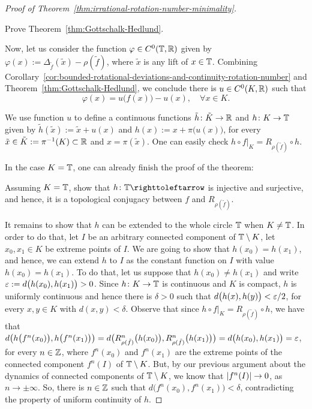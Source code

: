 \begin{proof}[Proof of Theorem~\ref{thm:irrational-rotation-number-minimality}]
  \begin{exercise}
    Prove Theorem~\ref{thm:Gottschalk-Hedlund}.
  \end{exercise}

  Now, let us consider the function $\varphi\in C^0(\mathbb{T},\mathbb{R})$ given by $\varphi(x):=\Delta_{\tilde f}(\tilde x)-\rho(\tilde f)$, where $\tilde x$ is any lift of $x\in\mathbb{T}$. Combining Corollary~\ref{cor:bounded-rotational-deviations-and-continuity-rotation-number} and Theorem~\ref{thm:Gottschalk-Hedlund}, we conclude there is $u\in C^0(K,\mathbb{R})$ such that
  \begin{displaymath}
    \varphi(x)=u\big(f(x)\big)-u(x), \quad\forall x\in K.
  \end{displaymath}

  We use function $u$ to define a continuous functions $\tilde h\colon\tilde{K}\to\mathbb{R}$ and $h\colon K\to\mathbb{T}$ given by $\tilde h(\tilde x):=\tilde x+u(x)$ and $h(x):=x+\pi\big(u(x)\big)$, for every $\tilde x\in\tilde{K}:=\pi^{-1}(K)\subset\mathbb{R}$ and $x=\pi(\tilde x)$. One can easily check $h\circ f\big|_K=R_{\rho(\tilde f)}\circ h$.

  In the case $K=\mathbb{T}$, one can already finish the proof of the theorem:

  \begin{exercise}
    Assuming $K=\mathbb{T}$, show that $h\colon\T\carr$ is injective and surjective, and hence, it is a topological conjugacy between $f$ and $R_{\rho(\tilde f)}$.
  \end{exercise}

  It remains to show that $h$ can be extended to the whole circle $\mathbb{T}$ when $K\neq\mathbb{T}$. In order to do that, let $I$ be an arbitrary connected component of $\mathbb{T}\setminus K$, let $x_0,x_1\in K$ be extreme points of $I$. We are going to show that $h(x_0)=h(x_1)$, and hence, we can extend $h$ to $I$ as the constant function on $I$ with value $h(x_0)=h(x_1)$. To do that, let us suppose that $h(x_0)\neq h(x_1)$ and write $\varepsilon:=d\big(h(x_0),h(x_1)\big)>0$. Since $h\colon K\to\mathbb{T}$ is continuous and $K$ is compact, $h$ is uniformly continuous and hence there is $\delta>0$ such that $d\big(h(x),h(y)\big)<\varepsilon/2$, for every $x,y\in K$ with $d(x,y)<\delta$. Observe that since $h\circ f\big|_K=R_{\rho(\tilde f)}\circ h$, we have that $d\big(h\big(f^n(x_0)\big),h\big(f^n(x_1)\big)\big)=d\big(R_{\rho(\tilde f)}^n\big(h(x_0)\big),R_{\rho(\tilde f)}^n\big(h(x_1)\big)\big)=d\big(h(x_0),h(x_1)\big)=\varepsilon$, for every $n\in\mathbb{Z}$, where $f^n(x_0)$ and $f^n(x_1)$ are the extreme points of the connected component $f^n(I)$ of $\mathbb{T}\setminus K$. But, by our previous argument about the dynamics of connected components of $\mathbb{T}\setminus K$, we know that $\left\lvert{f^n(I)}\right\rvert\to 0$, as $n\to\pm\infty$. So, there is $n\in\mathbb{Z}$ such that $d\big(f^n(x_0),f^n(x_1)\big)<\delta$, contradicting  the property of uniform continuity of $h$.
\end{proof}



